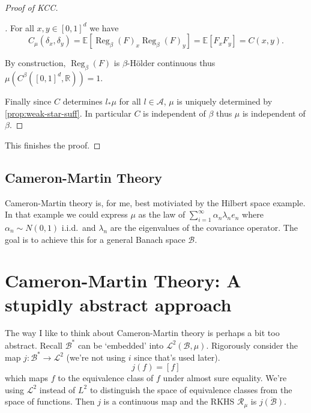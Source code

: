 \documentclass[fontsize=12pt, DIV=10]{scrreprt}
\theoremstyle{remark}
\newenvironment{subproof}[1][\proofname]{%
  \renewcommand{\qedsymbol}{$\blacksquare$}%
  \begin{proof}[#1]%
}{%
  \end{proof}%
}
\newcommand{\R}{\mathbb R}
\newcommand{\E}{\mathbb E}
\newcommand{\calA}{\mathcal A}
\newcommand{\calB}{\mathcal B}
\newcommand{\calL}{\mathcal L}
\newcommand{\calR}{\mathcal R}
\DeclareMathOperator{\reg}{Reg}
\newcommand{\unitbox}{\ensuremath{[0,1]^d}}
\begin{document}
\begin{proof}[Proof of KCC]
\begin{subproof}
		For all $x, y \in [0, 1]^d$ we have
		\begin{equation}
			C_{\mu}(\delta_x, \delta_y) = \E[\reg_{\beta}(F)_x \reg_{\beta}(F)_y]
			= \E[F_x F_y] = C(x, y).
		\end{equation}

		By construction, $\reg_{\beta}(F)$ is $\beta$-H\"older continuous thus $\mu(C^{\beta}(\unitbox, \R)) = 1$.

		Finally since $C$ determines $l_* \mu$ for all $l \in \calA$, $\mu$ is uniquely determined by \vref{prop:weak-star-suff}. In particular $C$ is independent of $\beta$ thus $\mu$ is independent of $\beta$.
	\end{subproof}

	This finishes the proof.
\end{proof}

\section{Cameron-Martin Theory}

Cameron-Martin theory is, for me, best motiviated by the Hilbert space example. In that example we could express $\mu$ as the law of $\sum_{i=1}^{\infty} \alpha_n \lambda_n e_n$ where $\alpha_n \sim N(0, 1)$ i.i.d.\ and $\lambda_n$ are the eigenvalues of the covariance operator. The goal is to achieve this for a general Banach space $\calB$.

\appendix

\chapter{Cameron-Martin Theory: A stupidly abstract approach}

The way I like to think about Cameron-Martin theory is perhaps a bit too abstract. Recall $\calB^*$ can be `embedded' into $\calL^2(\calB, \mu)$. Rigorously consider the map $j: \calB^* \to \calL^2$ (we're not using $i$ since that's used later).
\begin{equation}
	j(f) = [f]
\end{equation}
which maps $f$ to the equivalence class of $f$ under almost sure equality. We're using $\calL^2$ instead of $L^2$ to distinguish the space of equivalence classes from the space of functions. Then $j$ is a continuous map and the RKHS $\calR_{\mu}$ is $\overline{j(\calB)}$. 
\end{document}
